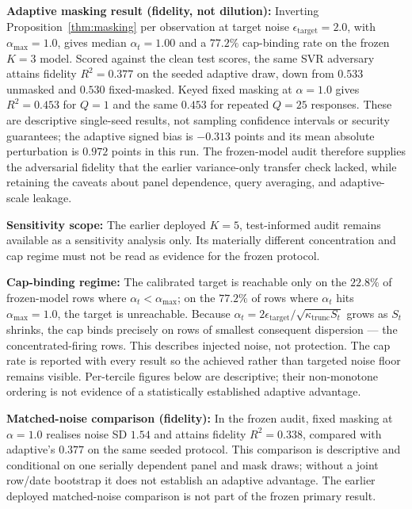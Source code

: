 \documentclass[pdflatex,sn-mathphys-num]{sn-jnl}
\theoremstyle{thmstyleone}
\theoremstyle{thmstyletwo}
\theoremstyle{thmstylethree}
\begin{document}
\noindent\textbf{Adaptive masking result (fidelity, not dilution):} Inverting Proposition~\ref{thm:masking} per observation at target noise $\epsilon_{\mathrm{target}}=2.0$, with $\alpha_{\max}=1.0$, gives median $\alpha_t=1.00$ and a $77.2\%$ cap-binding rate on the frozen $K=3$ model. Scored against the clean test scores, the same SVR adversary attains fidelity $R^2=0.377$ on the seeded adaptive draw, down from $0.533$ unmasked and $0.530$ fixed-masked. Keyed fixed masking at $\alpha=1.0$ gives $R^2=0.453$ for $Q=1$ and the same $0.453$ for repeated $Q=25$ responses. These are descriptive single-seed results, not sampling confidence intervals or security guarantees; the adaptive signed bias is $-0.313$ points and its mean absolute perturbation is $0.972$ points in this run. The frozen-model audit therefore supplies the adversarial fidelity that the earlier variance-only transfer check lacked, while retaining the caveats about panel dependence, query averaging, and adaptive-scale leakage.

\noindent\textbf{Sensitivity scope:} The earlier deployed $K=5$, test-informed audit remains available as a sensitivity analysis only. Its materially different concentration and cap regime must not be read as evidence for the frozen protocol.

\noindent\textbf{Cap-binding regime:} The calibrated target is reachable only on the $22.8\%$ of frozen-model rows where $\alpha_t < \alpha_{\max}$; on the $77.2\%$ of rows where $\alpha_t$ hits $\alpha_{\max}=1.0$, the target is unreachable. Because $\alpha_t=2\epsilon_{\mathrm{target}}/\sqrt{\kappa_{\mathrm{trunc}} S_t}$ grows as $S_t$ shrinks, the cap binds precisely on rows of smallest consequent dispersion --- the concentrated-firing rows. This describes injected noise, not protection. The cap rate is reported with every result so the achieved rather than targeted noise floor remains visible. Per-tercile figures below are descriptive; their non-monotone ordering is not evidence of a statistically established adaptive advantage.

\noindent\textbf{Matched-noise comparison (fidelity):} In the frozen audit, fixed masking at $\alpha=1.0$ realises noise SD $1.54$ and attains fidelity $R^2=0.338$, compared with adaptive's $0.377$ on the same seeded protocol. This comparison is descriptive and conditional on one serially dependent panel and mask draws; without a joint row/date bootstrap it does not establish an adaptive advantage. The earlier deployed matched-noise comparison is not part of the frozen primary result.
\end{document}

